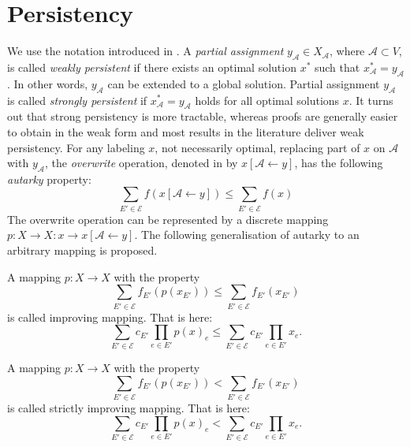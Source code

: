 \section{Persistency}
We use the notation introduced in \cite{Shek}. A \textit{partial assignment} $y_{\mathcal{A}} \in X_{\mathcal{A}}$, where $\mathcal{A} \subset V$, is called \textit{weakly persistent} if there exists an optimal solution $x^*$ such that $x^*_{\mathcal{A}}=y_{\mathcal{A}}$. In other words, $y_{\mathcal{A}}$ can be extended to a global solution. Partial assignment $y_{\mathcal{A}}$ is called \textit{strongly persistent} if $x^*_{\mathcal{A}}=y_{\mathcal{A}}$ holds for all optimal solutions $x$. It turns out that strong persistency is more tractable, whereas proofs are generally easier to obtain in the weak form and most results in the literature deliver weak persistency. \cite{Shek}
For any labeling $x$, not necessarily optimal, replacing part of $x$ on $\mathcal{A}$ with $y_{\mathcal{A}}$, the \textit{overwrite} operation, denoted in \cite{Shek} by $x[\mathcal{A} \leftarrow y]$, has the following \textit{autarky} property: 
\begin{equation}
    \sum_{E' \in \mathcal{E}} f(x[\mathcal{A} \leftarrow y]) \leq \sum_{E' \in \mathcal{E}} f(x) 
\end{equation}
The overwrite operation can be represented by a discrete mapping $p: X \rightarrow X: x \rightarrow x[\mathcal{A} \leftarrow y]$. The following generalisation of autarky to an arbitrary mapping is proposed. 
\begin{definition}
A mapping $p \colon X \to X$ with the property 
\begin{equation}
\sum_{E' \in \mathcal{E}} f_{E'}(p(x_{E'})) \leq \sum_{E' \in \mathcal{E}} f_{E'}(x_{E'}) 
\end{equation} 
is called improving mapping. That is here: 
\begin{equation}
\sum_{E' \in \mathcal{E}} c_{E'} \prod_{e \in E'} p(x)_e \leq 
\sum_{E' \in \mathcal{E}} c_{E'} \prod_{e \in E'} x_e.
\end{equation}
\end{definition}
\begin{definition}
A mapping $p \colon X \to X$ with the property 
\begin{equation}
\sum_{E' \in \mathcal{E}} f_{E'}(p(x_{E'})) < \sum_{E' \in \mathcal{E}} f_{E'}(x_{E'}) 
\end{equation} 
is called strictly improving mapping. That is here: 
\begin{equation}
\sum_{E' \in \mathcal{E}} c_{E'} \prod_{e \in E'} p(x)_e < 
\sum_{E' \in \mathcal{E}} c_{E'} \prod_{e \in E'} x_e.
\end{equation}
\end{definition}




